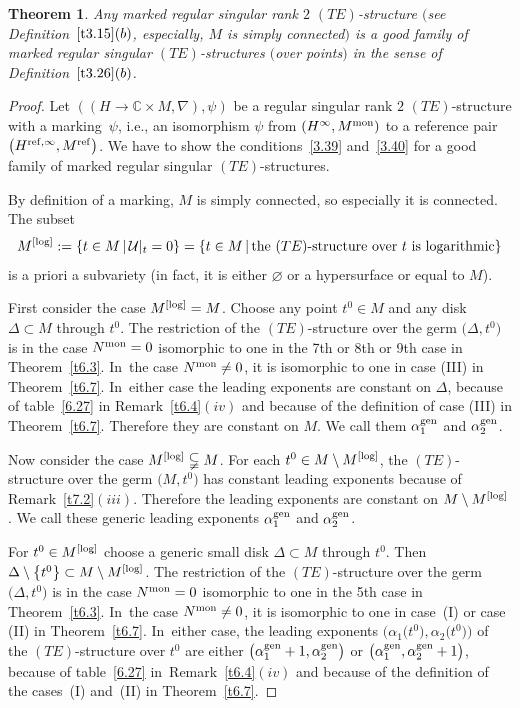\documentclass[10pt,a4paper]{amsart}
\numberwithin{equation}{section}
\numberwithin{figure}{section}
\newcommand{\C}{{\mathbb C}}
\newcommand{\UU}{{\mathcal U}}
\newcommand{\nnn}{\nabla}
\newtheorem{Theorem}{Theorem}[section]
\begin{document}
\begin{Theorem}\label{t7.3}
Any marked regular singular rank $2$ $(TE)$-structure
$($see Definition~$\ref{t3.15}(b)$, espe\-cially,
$M$ is simply connected$)$
is a {\it good} family of marked regular singular
$(TE)$-structures $($over points$)$ in the sense of Definition~$\ref{t3.26}(b)$.
\end{Theorem}

\begin{proof} Let $((H\to\C\times M,\nnn),\psi)$
be a regular singular rank $2$
$(TE)$-structure with a marking~$\psi$,
i.e., an isomorphism $\psi$ from $(H^\infty,M^{\rm mon})$
to a reference pair $\big(H^{{\rm ref},\infty},M^{\rm ref}\big)$.
We have to show the conditions~\eqref{3.39} and~\eqref{3.40}
for a good family of marked regular singular $(TE)$-structures.

By definition of a marking, $M$ is simply connected,
so especially it is connected. The subset
\begin{gather*}%
M^{\rm [log]}:=\{t\in M\,|\, \UU|_t=0\}
=\{t\in M\,|\, \text{the }(TE)\text{-structure over }
t\text{ is logarithmic}\}
\end{gather*}
is a priori a subvariety (in fact, it is either $\varnothing$
or a hypersurface or equal to $M$).

First consider the case $M^{\rm [log]}=M$.
Choose any point $t^0\in M$ and any disk $\Delta\subset M$
through $t^0$. The restriction of the $(TE)$-structure
over the germ $\big(\Delta,t^0\big)$ is in the case $N^{\rm mon}=0$
isomorphic to one in the 7th or 8th or 9th case in Theorem~\ref{t6.3}. In~the case $N^{\rm mon}\neq 0$, it is
isomorphic to one in case (III) in Theorem~\ref{t6.7}. In~either case the leading exponents are constant on $\Delta$,
because of table~\eqref{6.27}
in Remark~\ref{t6.4}$(iv)$ and because of the definition
of case (III) in Theorem~\ref{t6.7}.
Therefore they are constant on $M$.
We call them $\alpha_1^{\rm gen}$ and $\alpha_2^{\rm gen}$.

Now consider the case $M^{\rm [log]}\subsetneqq M$.
For each $t^0\in M\setminus M^{\rm [log]}$, the $(TE)$-structure
over the germ $\big(M,t^0\big)$ has constant leading
exponents because of Remark~\ref{t7.2}$(iii)$.
Therefore the leading exponents are constant on
$M\setminus M^{\rm [log]}$. We call these generic leading exponents
$\alpha_1^{\rm gen}$ and $\alpha_2^{\rm gen}$.

For $t^0\in M^{\rm [log]}$ choose a generic small disk
$\Delta\subset M$ through $t^0$. Then
$\Delta\setminus \big\{t^0\big\}\subset M\setminus M^{\rm [log]}$. The restriction of the
$(TE)$-structure over the germ $\big(\Delta,t^0\big)$ is
in the case $N^{\rm mon}=0$ isomorphic to one in the 5th case
in Theorem~\ref{t6.3}. In~the case $N^{\rm mon}\neq 0$,
it is isomorphic to one in case~(I) or case (II)
in Theorem~\ref{t6.7}. In~either case, the leading exponents
$\big(\alpha_1\big(t^0\big),\alpha_2\big(t^0\big)\big)$ of the $(TE)$-structure
over $t^0$ are either $\big(\alpha_1^{\rm gen}+1,\alpha_2^{\rm gen}\big)$
or $\big(\alpha_1^{\rm gen},\alpha_2^{\rm gen}+1\big)$,
because of table~\eqref{6.27} in~Remark~\ref{t6.4}$(iv)$ and
because of the definition of the cases~(I) and~(II)
in Theorem~\ref{t6.7}.


\end{proof}
\end{document}

